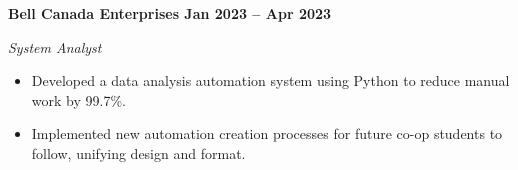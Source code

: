 \vspace{0.1cm}
\textbf{Bell Canada Enterprises \hfill Jan 2023 -- Apr 2023} \par
\textit{System Analyst} \par
\begin{itemize}
	\item Developed a data analysis automation system using Python to reduce manual work by 99.7\%.
  \item Implemented new automation creation processes for future co-op students to follow, unifying design and format.
\end{itemize} \par